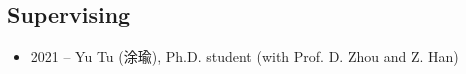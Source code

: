 \documentclass[10pt]{article}
\begin{document}
\subsection*{Supervising}
\begin{itemize}
\itemsep-0.5em 
\item 2021 -- Yu Tu (涂瑜), Ph.D. student (with Prof. D. Zhou and Z. Han)
\end{itemize}

\end{document}
